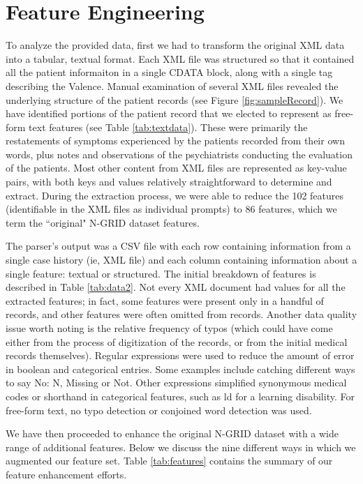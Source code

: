 \chapter{Feature Engineering}\label{sec:features}

To analyze the provided data, first we had to transform the original XML data into a tabular, textual format. Each XML file was structured so that it contained all the patient informaiton in a single CDATA block, along with a single tag describing the Valence. Manual examination of several XML files revealed the underlying structure of the patient records (see Figure \ref{fig:sampleRecord}).  
We have identified portions of the patient record that we elected
to represent as free-form text features (see Table \ref{tab:textdata}). 
These were primarily the restatements of  symptoms experienced
by the patients recorded from
their own words, plus notes and observations of the psychiatrists conducting the
evaluation of the patients.  Most other content from XML files 
are represented as key-value pairs, with both keys and values relatively straightforward
to determine and extract. During the extraction process, we were able to reduce the 102
features (identifiable in the XML files as individual prompts) to 86 features, which
we term the ``original" N-GRID dataset features.

 The parser's output 
 was a CSV file with each row containing information from a single case 
 history (ie, XML file) and each column containing information about a single feature: textual or
 structured. The initial breakdown of features is described in Table \ref{tab:data2}.  Not every
 XML document had values for all the extracted features; in fact, some features were
 present only in a handful of records, and other features were often omitted from records. Another data quality issue worth noting is the relative frequency of typos (which could have come either from the process of digitization of the records, or from the initial medical records themselves). Regular expressions were used to reduce the amount of error in boolean and categorical entries. Some examples include catching different ways to say \textsf{No}: \textsf{N}, \textsf{Missing} or  \textsf{Not}. Other expressions simplified synonymous medical codes or shorthand in categorical features, such as \textsf{ld} for a \textsf{learning disability}. For free-form text, no typo detection or conjoined word detection was used. 
 

We have then proceeded to enhance the original N-GRID dataset with a wide range
of additional features. Below we discuss the nine different ways in which we augmented our feature set. Table \ref{tab:features} contains the summary of our feature
enhancement efforts.

